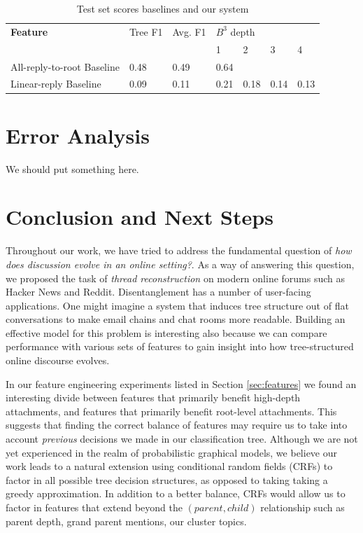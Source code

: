 \documentclass{article}
\begin{document}
\begin{table}[h]\footnotesize
 \begin{tabular}{| l | l | l | l | l | l | l |} 
   \hline
   \textbf{Feature} & Tree F1 & Avg. F1 & \multicolumn{4}{l|}{$B^3$ depth} \\
                      & & & 1 & 2 & 3 & 4\\
   \hline
   All-reply-to-root Baseline & 0.48 & 0.49 & 0.64 & & & \\
        Linear-reply Baseline & 0.09 & 0.11 & 0.21 & 0.18 & 0.14 & 0.13 \\
   \hline
  \end{tabular}
  \caption{Test set scores baselines and our system}
  \label{table:results}
\end{table}

\section{Error Analysis}
We should put something here.

\section{Conclusion and Next Steps}
Throughout our work, we have tried to address the fundamental question of
\textit{how does discussion evolve in an online setting?}. As a way of answering
this question, we proposed the task of \textit{thread reconstruction} on modern
online forums such as Hacker News and Reddit. Disentanglement has a number of
user-facing applications. One might imagine a system that induces tree structure
out of flat conversations to make email chains and chat rooms more readable.
Building an effective model for this problem is interesting also because we can
compare performance with various sets of features to gain insight into how 
tree-structured online discourse evolves.

In our feature engineering experiments listed in Section \ref{sec:features} we
found an interesting divide between features that primarily benefit high-depth
attachments, and features that primarily benefit root-level attachments. This
suggests that finding the correct balance of features may require us to take into
account \textit{previous} decisions we made in our classification tree. Although
we are not yet experienced in the realm of probabilistic graphical models, we
believe our work leads to a natural extension using conditional random fields
(CRFs) to factor in all possible tree decision structures, as opposed to taking
taking a greedy approximation. In addition to a better balance, CRFs
would allow us to factor in features that extend beyond the $(parent,child)$
relationship such as parent depth, grand parent mentions, our cluster topics. 
\end{document}

